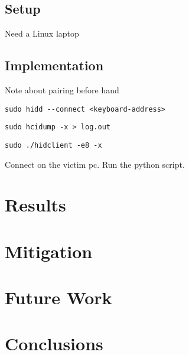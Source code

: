 \documentclass{acm_proc_article-sp}
\begin{document}
\subsection{Setup}
Need a Linux laptop

\subsection{Implementation}
Note about pairing before hand
\begin{verbatim}
sudo hidd --connect <keyboard-address>
\end{verbatim}

\begin{verbatim}
sudo hcidump -x > log.out
\end{verbatim}

\begin{verbatim}
sudo ./hidclient -e8 -x
\end{verbatim}

Connect on the victim pc.
Run the python script.

\section{Results}

\section{Mitigation}
\section{Future Work}
\section{Conclusions}

%


\balancecolumns
\end{document}
